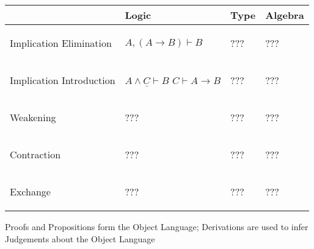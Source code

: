 \begin{tabular}{| p{2cm} | p{3cm} | p{4.5cm} | p{3cm} |}
\hline
& \textbf{Logic} & \textbf{Type} & \textbf{Algebra}\\ \hline \hline
Implication Elimination
  & \begin{center} $A, (A \rightarrow B) \vdash B$ \end{center}
  & \begin{center} ??? \end{center}
  & \begin{center} ??? \end{center} \\ \hline
Implication Introduction
  & \begin{center}
      $\underline{A \wedge C \vdash B}$\newline
      $C \vdash A \rightarrow B$
    \end{center}
  & \begin{center} ??? \end{center}
  & \begin{center} ??? \end{center} \\ \hline
Weakening
  & \begin{center} ??? \end{center}
  & \begin{center} ??? \end{center}
  & \begin{center} ??? \end{center} \\ \hline
Contraction
  & \begin{center} ??? \end{center}
  & \begin{center} ??? \end{center}
  & \begin{center} ??? \end{center} \\ \hline
Exchange
  & \begin{center} ??? \end{center}
  & \begin{center} ??? \end{center}
  & \begin{center} ??? \end{center} \\ \hline
\hline
\end{tabular}

Proofs and Propositions form the Object Language; Derivations are used
to infer Judgements about the Object Language


